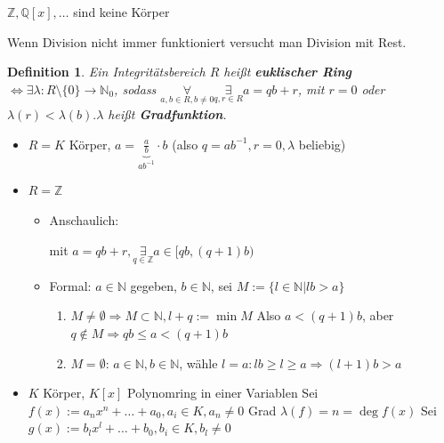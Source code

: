 \documentclass{article}
\newtheorem{defi}[thm]{Definition}
\newcommand{\N}{\mathbb{N}}
\newcommand{\Z}{\mathbb{Z}}
\newcommand{\Q}{\mathbb{Q}}
\begin{document}
$\Z,\Q[x],\hdots$ sind keine Körper

Wenn Division nicht immer funktioniert versucht man
Division mit Rest.
\begin{defi}
    Ein Integritätsbereich $R$ heißt
    \textbf{euklischer Ring} $\Leftrightarrow\exists
    \lambda:R\setminus\{0\}\rightarrow\N_0$, sodass
    $\underset{a,b\in R,b\neq 0}\forall
    \underset{q,r\in R}\exists a=qb+r$, mit
    $r=0$ oder $\lambda(r)<\lambda(b).\lambda$ heißt
    \textbf{Gradfunktion}.
\end{defi}
\color{purple}
\begin{itemize}
    \item
        $R=K$ Körper, $a=\underbrace{\frac{a}{b}}_{ab^{-1}}
        \cdot b$ (also $q=ab^{-1},r=0,\lambda$ beliebig)
    \item
        $R=\Z$
        \begin{itemize}
            \item
                Anschaulich:\\
                mit $a=qb+r,\underset{q\in\Z}\exists a\in[qb,(q+1)b)$
            \item
                Formal:
                $a\in\N$ gegeben, $b\in\N$,
                sei $M:=\{l\in\N|lb>a\}$
                \begin{enumerate}
                    \item
                        $M\neq\emptyset\Rightarrow
                        M\subset\N, l+q:=\min M$
                        Also $a<(q+1)b$, aber
                        $q\notin M\Rightarrow
                        qb\leq a<(q+1)b$
                    \item
                        $M=\emptyset$:
                        $a\in\N,b\in\N$, wähle $l=a:lb\geq l
                        \geq a \Rightarrow (l+1) b>a$
                \end{enumerate}
        \end{itemize}
    \item
        $K$ Körper, $K[x]$ Polynomring in einer Variablen
        Sei $f(x):=a_nx^n+\hdots+a_0,a_i\in K,a_n\neq 0$
        Grad $\lambda(f)=n=\deg f(x)$
        Sei $g(x):=b_lx^l+\hdots+b_0,b_i\in K,b_l\neq 0$


\end{itemize}
\end{document}
